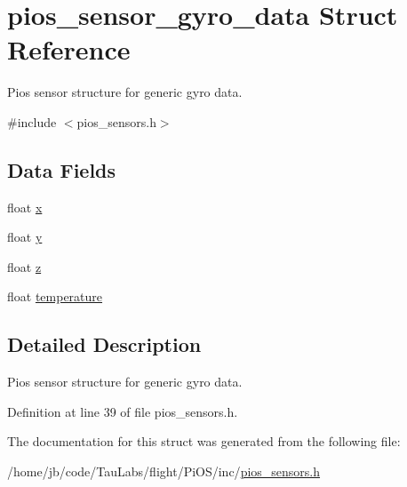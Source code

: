 \hypertarget{structpios__sensor__gyro__data}{\section{pios\-\_\-sensor\-\_\-gyro\-\_\-data \-Struct \-Reference}
\label{structpios__sensor__gyro__data}
}


\-Pios sensor structure for generic gyro data.  




{\ttfamily \#include $<$pios\-\_\-sensors.\-h$>$}

\subsection*{\-Data \-Fields}
\begin{DoxyCompactItemize}
\item 
float \hyperlink{group___p_i_o_s___s_e_n_s_o_r_s_gaa3675ec6a2d0ed4f805311fef19c0c8b}{x}
\item 
float \hyperlink{group___p_i_o_s___s_e_n_s_o_r_s_gaad82a3c1fcca51db61c84eb792d19842}{y}
\item 
float \hyperlink{group___p_i_o_s___s_e_n_s_o_r_s_ga54e998de17a4da6aa1f8504cce31a31c}{z}
\item 
float \hyperlink{group___p_i_o_s___s_e_n_s_o_r_s_ga9f44abb5eea58728c07c17a58155f6e8}{temperature}
\end{DoxyCompactItemize}


\subsection{\-Detailed \-Description}
\-Pios sensor structure for generic gyro data. 

\-Definition at line 39 of file pios\-\_\-sensors.\-h.



\-The documentation for this struct was generated from the following file\-:\begin{DoxyCompactItemize}
\item 
/home/jb/code/\-Tau\-Labs/flight/\-Pi\-O\-S/inc/\hyperlink{pios__sensors_8h}{pios\-\_\-sensors.\-h}\end{DoxyCompactItemize}
